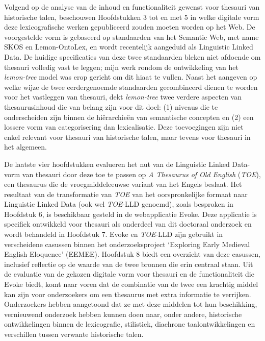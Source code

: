 Volgend op de analyse van de inhoud en functionaliteit gewenst voor thesauri van historische talen, beschouwen Hoofdstukken 3 tot en met 5 in welke digitale vorm deze lexicografische werken gepubliceerd zouden moeten worden op het Web. De voorgestelde vorm is gebaseerd op standaarden van het Semantic Web, met name SKOS en Lemon-OntoLex, en wordt recentelijk aangeduid als Linguistic Linked Data. De huidige specificaties van deze twee standaarden bleken niet afdoende om thesauri volledig vast te leggen; mijn werk rondom de ontwikkeling van het \textit{lemon-tree} model was erop gericht om dit hiaat te vullen. Naast het aangeven op welke wijze de twee eerdergenoemde standaarden gecombineerd dienen te worden voor het vastleggen van thesauri, dekt \textit{lemon-tree} twee verdere aspecten van thesaurusinhoud die van belang zijn voor dit doel: (1) niveaus die te onderscheiden zijn binnen de hiërarchieën van semantische concepten en (2) een lossere vorm van categorisering dan lexicalisatie. Deze toevoegingen zijn niet enkel relevant voor thesauri van historische talen, maar tevens voor thesauri in het algemeen.

De laatste vier hoofdstukken evalueren het nut van de Linguistic Linked Data-vorm van thesauri door deze toe te passen op \textit{A Thesaurus of Old English} (\textit{TOE}), een thesaurus die de vroegmiddeleeuwse variant van het Engels beslaat. Het resultaat van de transformatie van \textit{TOE} van het oorspronkelijke formaat naar Linguistic Linked Data (ook wel \textit{TOE}-LLD genoemd), zoals besproken in Hoofdstuk 6, is beschikbaar gesteld in de webapplicatie Evoke. Deze applicatie is specifiek ontwikkeld voor thesauri als onderdeel van dit doctoraal onderzoek en wordt behandeld in Hoofdstuk 7. Evoke en \textit{TOE}-LLD zijn gebruikt in verscheidene casussen binnen het onderzoeksproject `Exploring Early Medieval English Eloquence' (EEMEE). Hoofdstuk 8 biedt een overzicht van deze casussen, inclusief reflectie op de waarde van de twee bronnen die erin centraal staan. Uit de evaluatie van de gekozen digitale vorm voor thesauri en de functionaliteit die Evoke biedt, komt naar voren dat de combinatie van de twee een krachtig middel kan zijn voor onderzoekers om een thesaurus met extra informatie te verrijken. Onderzoekers hebben aangetoond dat ze met deze middelen tot hun beschikking, vernieuwend onderzoek hebben kunnen doen naar, onder andere, historische ontwikkelingen binnen de lexicografie, stilistiek, diachrone taalontwikkelingen en verschillen tussen verwante historische talen. %

\clearpage 